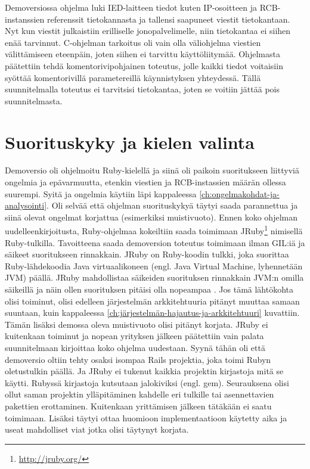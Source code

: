Demoversiossa ohjelma luki IED-laitteen tiedot kuten IP-osoitteen ja RCB-instanssien referenssit tietokannasta ja tallensi saapuneet viestit tietokantaan. Nyt kun viestit julkaistiin erilliselle jonopalvelimelle, niin tietokantaa ei siihen enää tarvinnut. C-ohjelman tarkoitus oli vain olla väliohjelma viestien välittämiseen eteenpäin, joten siihen ei tarvittu käyttöliitymää. Ohjelmasta päätettiin tehdä komentorivipohjainen toteutus, jolle kaikki tiedot voitaisiin syöttää komentorivillä parametereillä käynnistyksen yhteydessä. Tällä suunnitelmalla toteutus ei tarvitsisi tietokantaa, joten se voitiin jättää pois suunnitelmasta.


\section{Suorituskyky ja kielen valinta}
Demoversio oli ohjelmoitu Ruby-kielellä ja siinä oli paikoin suoritukseen liittyviä ongelmia ja epävarmuutta, etenkin viestien ja RCB-instassien määrän ollessa suurempi. Syitä ja ongelmia käytiin läpi kappaleessa \ref{ch:ongelmakohdat-ja-analysointi}. Oli selvää että ohjelman suorituskykyä täytyi saada parannettua ja siinä olevat ongelmat korjattua (esimerkiksi muistivuoto). Ennen koko ohjelman uudelleenkirjoitusta, Ruby-ohjelmaa kokeiltiin saada toimimaan JRuby\footnote{\url{http://jruby.org/}} nimisellä Ruby-tulkilla. Tavoitteena saada demoversion toteutus toimimaan ilman GIL:iä ja säikeet suoritukseen rinnakkain. JRuby on Ruby-koodin tulkki, joka suorittaa Ruby-lähdekoodia Java virtuaalikoneen (engl. Java Virtual Machine, lyhennetään JVM) päällä. JRuby mahdollistaa säikeiden suorituksen rinnakkain JVM:n omilla säikeillä ja näin ollen suorituksen pitäisi olla nopeampaa \cite{Youssef2013}. Jos tämä lähtökohta olisi toiminut, olisi edelleen järjestelmän arkkitehtuuria pitänyt muuttaa samaan suuntaan, kuin kappaleessa \ref{ch:järjestelmän-hajautus-ja-arkkitehtuuri} kuvattiin. Tämän lisäksi demossa oleva muistivuoto olisi pitänyt korjata. JRuby ei kuitenkaan toiminut ja nopean yrityksen jälkeen päätettiin vain palata suunnitelmaan kirjoittaa koko ohjelma uudestaan. Syynä tähän oli että demoversio oltiin tehty osaksi isompaa Rails projektia, joka toimi Rubyn oletustulkin päällä. Ja JRuby ei tukenut kaikkia projektin kirjastoja mitä se käytti. Rubyssä kirjastoja kutsutaan jalokiviksi (engl. gem). Seurauksena olisi ollut saman projektin ylläpitäminen kahdelle eri tulkille tai asennettavien pakettien erottaminen. Kuitenkaan yrittämisen jälkeen tätäkään ei saatu toimimaan. Lisäksi täytyi ottaa huomioon implementaatioon käytetty aika ja useat mahdolliset viat jotka olisi täytynyt korjata.

